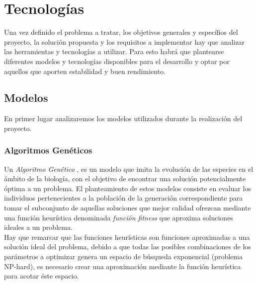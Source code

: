 
\chapter{Tecnologías}
\label{3.Tecnologias}

    Una vez definido el problema a tratar, los objetivos generales y específios del proyecto, la solución propuesta y los requisitos a implementar hay que analizar las herramientas y tecnologías a utilizar. Para esto habrá que plantearse diferentes modelos y tecnologías disponibles para el desarrollo y optar por aquellos que aporten estabilidad y buen rendimiento.

    \section{Modelos}

        En primer lugar analizaremos los modelos utilizados durante la realización del proyecto.

        \subsection {Algoritmos Genéticos}
            Un \textit{Algoritmo Genético} \cite{GA}, es un modelo que imita la evolución de las especies en el ámbito de la biología, con el objetivo de encontrar una solución potencialmente óptima a un problema. El planteamiento de estos modelos consiste en evaluar los individuos pertenecientes a la población de la generación correspondiente para tomar el subconjunto de aquellas soluciones que mejor calidad ofrezcan mediante una función heurística denominada \textit{función fitness} que aproxima soluciones ideales a un problema.\\

            Hay que remarcar que las funciones heurísticas son funciones aproximadas a una solución ideal del problema, debido a que todas las posibles combinaciones de los parámetros a optimizar genera un espacio de búsqueda exponencial (problema NP-hard), es necesario crear una aproximación mediante la función heurística para acotar éste espacio.\\

